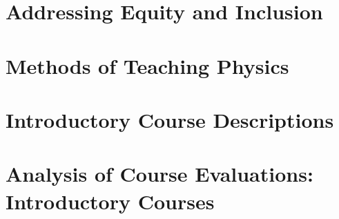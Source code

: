 \documentclass[../../main.tex]{subfiles}
\begin{document}
\section{Addressing Equity and Inclusion}
\label{sec:equity_inclusion}

%

\begin{flushleft}

\end{flushleft}

\section{Methods of Teaching Physics}
\label{sec:methods}

%

\begin{flushleft}

\end{flushleft}

\section{Introductory Course Descriptions}
\label{sec:intro}

%

\begin{flushleft}

\end{flushleft}

\section{Analysis of Course Evaluations: Introductory Courses}
\label{sec:intro_eval}

%

\begin{flushleft}

\end{flushleft}
\end{document}
